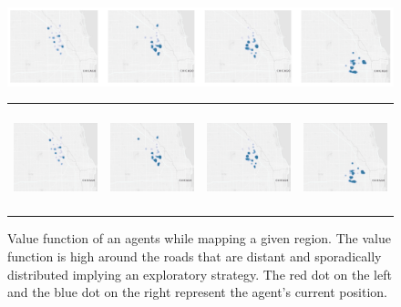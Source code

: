 \begin{figure}[t]
  \begin{center}
  \iflatexml
    \includegraphics[width=6\textwidth]{figs/heatmap_spo.png}
  \else
    \begin{tabular}{llll}
      \includegraphics[height=3.0cm,trim={0.2cm 0 0.4cm 0},clip]{figs/sporadic1.png} &
      \includegraphics[height=3.0cm,trim={0.2cm 0 0.8cm 0},clip]{figs/sporadic2.png} &
      \includegraphics[height=3.0cm,trim={0.2cm 0 0.8cm 0},clip]{figs/sporadic3.png} &
      \includegraphics[height=3.0cm,trim={0.0cm 0 0cm 0},clip]{figs/sporadic4.png} \\
    \end{tabular}
  \fi
  \caption{Value function of an agents while mapping a given region.
  The value function is high around the roads that are distant and sporadically
  distributed implying an exploratory strategy. The red dot on the left and the blue dot
  on the right represent the agent's current position.}
  \label{fig:heatmap_sporadic}
  \end{center}
  \vspace{-0.25in}
\end{figure}